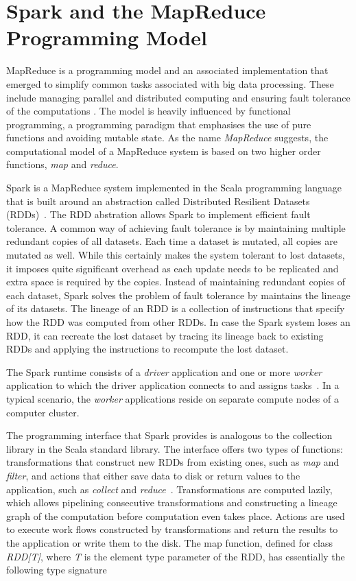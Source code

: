 \section{Spark and the MapReduce Programming Model}

MapReduce is a programming model and an associated implementation that emerged to simplify common tasks associated with big data processing. These include managing parallel and distributed computing and ensuring fault tolerance of the computations \cite{Dean:2008:MSD:1327452.1327492}. The model is heavily influenced by functional programming, a programming paradigm that emphasises the use of pure functions and avoiding mutable state. As the name \textit{MapReduce} suggests, the computational model of a MapReduce system is based on two higher order functions, \textit{map} and \textit{reduce}. 

Spark is a MapReduce system implemented in the Scala programming language that is built around an abstraction called Distributed Resilient Datasets (RDDs)~\cite{Zaharia:2012:RDD:2228298.2228301}. The RDD abstration allows Spark to implement efficient fault tolerance. A common way of achieving fault tolerance is by maintaining multiple redundant copies of all datasets. Each time a dataset is mutated, all copies are mutated as well. While this certainly makes the system tolerant to lost datasets, it imposes quite significant overhead as each update needs to be replicated and extra space is required by the copies. Instead of maintaining redundant copies of each dataset, Spark solves the problem of fault tolerance by maintains the lineage of its datasets. The lineage of an RDD is a collection of instructions that specify how the RDD was computed from other RDDs. In case the Spark system loses an RDD, it can recreate the lost dataset by tracing its lineage back to existing RDDs and applying the instructions to recompute the lost dataset.       

The Spark runtime consists of a \textit{driver} application and one or more \textit{worker} application to which the driver application connects to and assigns tasks~\cite{Zaharia:2012:RDD:2228298.2228301}. In a typical scenario, the \textit{worker} applications reside on separate compute nodes of a computer cluster.

The programming interface that Spark provides is analogous to the collection library in the Scala standard library. The interface offers two types of functions: transformations that construct new RDDs from existing ones, such as \textit{map} and \textit{filter}, and actions that either save data to disk or return values to the application, such as \textit{collect} and \textit{reduce}~\cite{Zaharia:2012:RDD:2228298.2228301}. Transformations are computed lazily, which allows pipelining consecutive transformations and constructing a lineage graph of the computation before computation even takes place. Actions are used to execute work flows constructed by transformations and return the results to the application or write them to the disk. The map function, defined for class \textit{RDD[T]}, where \textit{T} is the element type parameter of the RDD, has essentially the following type signature

